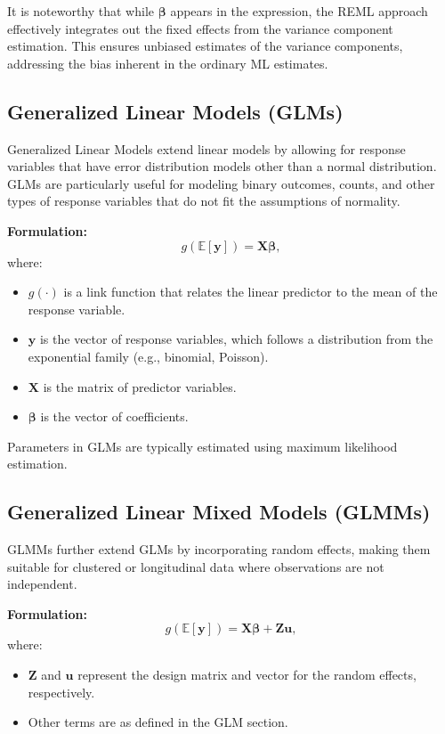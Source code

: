 \documentclass[12pt, twoside,hidelinks]{article}
\theoremstyle{definition}
\numberwithin{equation}{section}
\begin{document}
It is noteworthy that while \(\boldsymbol{\beta}\) appears in the expression, the REML approach effectively integrates out the fixed effects from the variance component estimation. This ensures unbiased estimates of the variance components, addressing the bias inherent in the ordinary ML estimates.

\subsection{Generalized Linear Models (GLMs)}

Generalized Linear Models extend linear models by allowing for response variables that have error distribution models other than a normal distribution. GLMs are particularly useful for modeling binary outcomes, counts, and other types of response variables that do not fit the assumptions of normality.

\textbf{Formulation:}
\begin{equation}
    g(\mathbb{E}[\mathbf{y}]) = \mathbf{X}\boldsymbol{\beta},
    \label{eq:glm_general_form}
\end{equation}
where:
\begin{itemize}
    \item \( g(\cdot) \) is a link function that relates the linear predictor to the mean of the response variable.
    \item \( \mathbf{y} \) is the vector of response variables, which follows a distribution from the exponential family (e.g., binomial, Poisson).
    \item \( \mathbf{X} \) is the matrix of predictor variables.
    \item \( \boldsymbol{\beta} \) is the vector of coefficients.
\end{itemize}

Parameters in GLMs are typically estimated using maximum likelihood estimation.

\subsection{Generalized Linear Mixed Models (GLMMs)}

GLMMs further extend GLMs by incorporating random effects, making them suitable for clustered or longitudinal data where observations are not independent.

\textbf{Formulation:}
\begin{equation}
    g(\mathbb{E}[\mathbf{y}]) = \mathbf{X}\boldsymbol{\beta} + \mathbf{Z}\boldsymbol{u},
    \label{eq:glmm_general_form}
\end{equation}
where:
\begin{itemize}
    \item \( \mathbf{Z} \) and \( \boldsymbol{u} \) represent the design matrix and vector for the random effects, respectively.
    \item Other terms are as defined in the GLM section.
\end{itemize}
\end{document}
